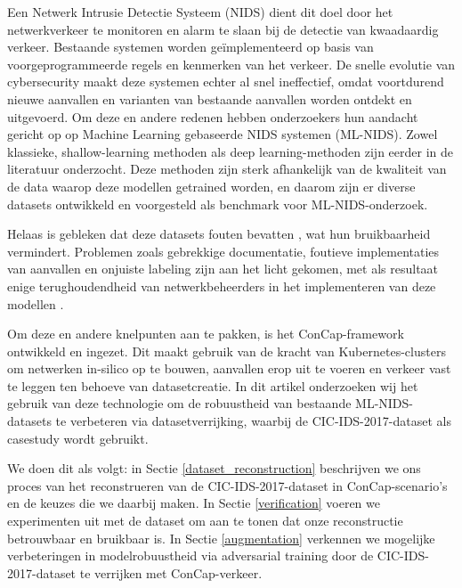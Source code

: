 \documentclass[conference]{IEEEtran}
\begin{document}
	Een Netwerk Intrusie Detectie Systeem (NIDS) dient dit doel door het netwerkverkeer te monitoren en alarm te slaan bij de detectie van kwaadaardig verkeer. Bestaande systemen \cite{snort, suricata, zeek} worden geïmplementeerd op basis van voorgeprogrammeerde regels en kenmerken van het verkeer. De snelle evolutie van cybersecurity maakt deze systemen echter al snel ineffectief, omdat voortdurend nieuwe aanvallen en varianten van bestaande aanvallen worden ontdekt en uitgevoerd. Om deze en andere redenen hebben onderzoekers hun aandacht gericht op op Machine Learning gebaseerde NIDS systemen (ML-NIDS). Zowel klassieke, shallow-learning methoden \cite{knn_2002, j48_dt, nids_svm} als deep learning-methoden \cite{nids_cnn, analysis_autoencoders} zijn eerder in de literatuur onderzocht. Deze methoden zijn sterk afhankelijk van de kwaliteit van de data waarop deze modellen getrained worden, en daarom zijn er diverse datasets \cite{cic_2017, cic_2018, unsw-nb15, iscx_ids_2012} ontwikkeld en voorgesteld als benchmark voor ML-NIDS-onderzoek.
	
	Helaas is gebleken dat deze datasets fouten bevatten \cite{troubleshooting_cic2017, bad_design_smells}, wat hun bruikbaarheid vermindert. Problemen zoals gebrekkige documentatie, foutieve implementaties van aanvallen en onjuiste labeling zijn aan het licht gekomen, met als resultaat enige terughoudendheid van netwerkbeheerders in het implementeren van deze modellen \cite{sok_pragmatic_assessment}.
	
	Om deze en andere knelpunten aan te pakken, is het ConCap-framework \cite{concap} ontwikkeld en ingezet. Dit maakt gebruik van de kracht van Kubernetes-clusters om netwerken in-silico op te bouwen, aanvallen erop uit te voeren en verkeer vast te leggen ten behoeve van datasetcreatie. In dit artikel onderzoeken wij het gebruik van deze technologie om de robuustheid van bestaande ML-NIDS-datasets te verbeteren via datasetverrijking, waarbij de CIC-IDS-2017-dataset \cite{cic_2017} als casestudy wordt gebruikt.
	
	We doen dit als volgt: in Sectie \ref{dataset_reconstruction} beschrijven we ons proces van het reconstrueren van de CIC-IDS-2017-dataset in ConCap-scenario’s en de keuzes die we daarbij maken. In Sectie \ref{verification} voeren we experimenten uit met de dataset om aan te tonen dat onze reconstructie betrouwbaar en bruikbaar is. In Sectie \ref{augmentation} verkennen we mogelijke verbeteringen in modelrobuustheid via adversarial training door de CIC-IDS-2017-dataset te verrijken met ConCap-verkeer.
	
\end{document}
